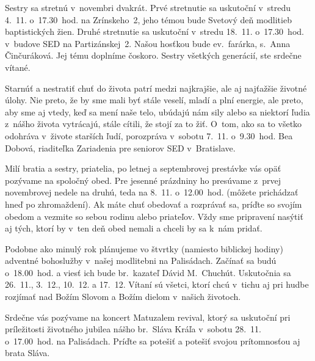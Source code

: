 \def\velkostpisma{9.9}
\def\velkostriadku{12.5}





Sestry sa stretnú v~novembri dvakrát. Prvé stretnutie sa uskutoční v~stredu 4.~11. o~17.30~hod. na Zrínskeho~2, jeho témou bude Svetový deň modlitieb baptistických žien. Druhé stretnutie sa uskutoční v~stredu 18.~11. o~17.30~hod. v~budove SED na Partizánskej~2. Našou hosťkou bude ev.~farárka, s.~Anna Činčuráková. Jej tému doplníme čoskoro. Sestry všetkých generácií, ste srdečne vítané.


Starnúť a nestratiť chuť do života patrí medzi najkrajšie, ale aj najťažšie životné úlohy. Nie preto, že by sme mali byť stále veselí, mladí a plní energie, ale preto, aby sme aj vtedy, keď sa mení naše telo, ubúdajú nám sily alebo sa niektorí ľudia z~nášho života vytrácajú, stále cítili, že stojí za to žiť. O~tom, ako sa to všetko odohráva v~živote starších ľudí, porozpráva v~sobotu 7.~11. o~9.30~hod. Bea Dobová, riaditeľka Zariadenia pre seniorov SED v~Bratislave.


Milí bratia a sestry, priatelia, po letnej a septembrovej prestávke vás opäť pozývame na spoločný obed. Pre jesenné prázdniny ho presúvame z~prvej novembrovej nedele na druhú, teda na 8.~11. o~12.00~hod. (môžete prichádzať hneď po zhromaždení). Ak máte chuť obedovať a rozprávať sa, príďte so svojím obedom a vezmite so sebou rodinu alebo priateľov. Vždy sme pripravení nasýtiť aj tých, ktorí by v~ten deň obed nemali a chceli by sa k~nám pridať.


Podobne ako minulý rok plánujeme vo štvrtky (namiesto biblickej hodiny) adventné bohoslužby v~našej modlitebni na Palisádach. Začínať sa budú o~18.00~hod. a viesť ich bude br.~kazateľ Dávid M.~Chuchút. Uskutočnia sa 26.~11., 3.~12., 10.~12. a 17.~12. Vítaní sú všetci, ktorí chcú
v~tichu aj pri hudbe rozjímať nad Božím Slovom a Božím dielom v~našich životoch.


Srdečne vás pozývame na koncert Matuzalem revival, ktorý sa uskutoční pri príležitosti životného jubilea nášho br.~Sláva Kráľa v~sobotu 28.~11. o~17.00~hod. na Palisádach.
Príďte sa potešiť a potešiť svojou prítomnosťou aj brata Sláva.


